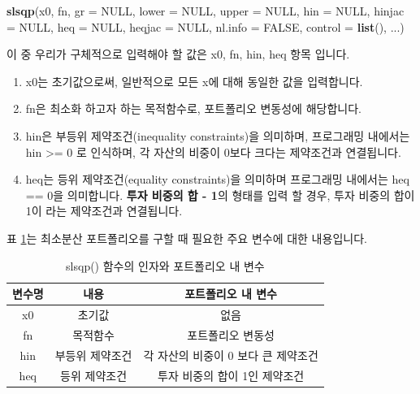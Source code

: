 \documentclass[12pt,]{book}
\newenvironment{Shaded}{\begin{snugshade}}{\end{snugshade}}
\newcommand{\DataTypeTok}[1]{\textcolor[rgb]{0.13,0.29,0.53}{#1}}
\newcommand{\KeywordTok}[1]{\textcolor[rgb]{0.13,0.29,0.53}{\textbf{#1}}}
\newcommand{\NormalTok}[1]{#1}
\newcommand{\OtherTok}[1]{\textcolor[rgb]{0.56,0.35,0.01}{#1}}
\providecommand{\tightlist}{%
  \setlength{\itemsep}{0pt}\setlength{\parskip}{0pt}}
\begin{document}
\begin{Shaded}
\begin{Highlighting}[]
\KeywordTok{slsqp}\NormalTok{(x0, fn, }\DataTypeTok{gr =} \OtherTok{NULL}\NormalTok{, }\DataTypeTok{lower =} \OtherTok{NULL}\NormalTok{, }\DataTypeTok{upper =} \OtherTok{NULL}\NormalTok{,}
      \DataTypeTok{hin =} \OtherTok{NULL}\NormalTok{, }\DataTypeTok{hinjac =} \OtherTok{NULL}\NormalTok{, }\DataTypeTok{heq =} \OtherTok{NULL}\NormalTok{, }\DataTypeTok{heqjac =} \OtherTok{NULL}\NormalTok{,}
      \DataTypeTok{nl.info =} \OtherTok{FALSE}\NormalTok{, }\DataTypeTok{control =} \KeywordTok{list}\NormalTok{(), ...)}
\end{Highlighting}
\end{Shaded}

이 중 우리가 구체적으로 입력해야 할 값은 x0, fn, hin, heq 항목 입니다.

\begin{enumerate}
\def\labelenumi{\arabic{enumi}.}
\tightlist
\item
  x0는 초기값으로써, 일반적으로 모든 x에 대해 동일한 값을 입력합니다.
\item
  fn은 최소화 하고자 하는 목적함수로, 포트폴리오 변동성에 해당합니다.
\item
  hin은 부등위 제약조건(inequality constraints)을 의미하며, 프로그래밍 내에서는 hin \textgreater{}= 0 로 인식하며, 각 자산의 비중이 0보다 크다는 제약조건과 연결됩니다.
\item
  heq는 등위 제약조건(equality constraints)을 의미하며 프로그래밍 내에서는 heq == 0을 의미합니다. \textbf{투자 비중의 합 - 1}의 형태를 입력 할 경우, 투자 비중의 합이 1이 라는 제약조건과 연결됩니다.
\end{enumerate}

표 \ref{tab:slsqp}는 최소분산 포트폴리오를 구할 때 필요한 주요 변수에 대한 내용입니다.

\begin{table}[!h]

\caption{\label{tab:slsqp}slsqp() 함수의 인자와 포트폴리오 내 변수}
\centering
\begin{tabular}{ccc}
\toprule
변수명 & 내용 & 포트폴리오 내 변수\\
\midrule
\rowcolor{gray!6}  x0 & 초기값 & 없음\\
fn & 목적함수 & 포트폴리오 변동성\\
\rowcolor{gray!6}  hin & 부등위 제약조건 & 각 자산의 비중이 0 보다 큰 제약조건\\
heq & 등위 제약조건 & 투자 비중의 합이 1인 제약조건\\
\bottomrule
\end{tabular}
\end{table}
\end{document}
